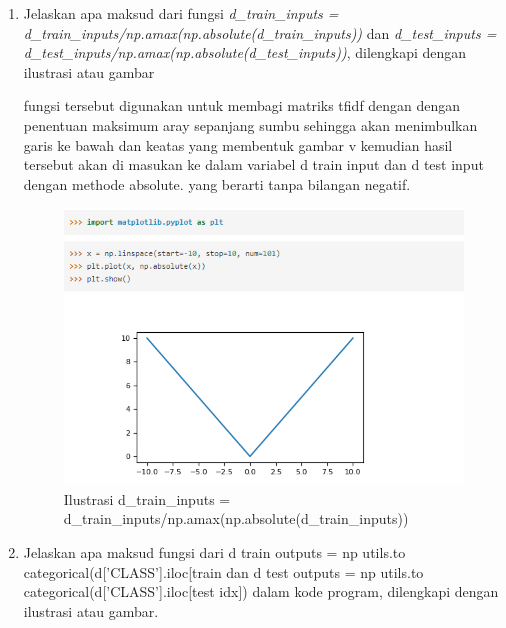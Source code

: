 \begin{enumerate}
\item Jelaskan apa maksud dari fungsi \emph{d\_train\_inputs = d\_train\_inputs/np.amax(np.absolute(d\_train\_inputs))} dan \emph{d\_test\_inputs = d\_test\_inputs/np.amax(np.absolute(d\_test\_inputs))}, dilengkapi dengan ilustrasi atau gambar \par

fungsi tersebut digunakan untuk membagi matriks tfidf dengan dengan penentuan maksimum aray sepanjang sumbu sehingga akan menimbulkan garis ke bawah dan keatas yang membentuk gambar v kemudian hasil tersebut akan di masukan ke dalam variabel d train input dan d test input dengan methode absolute. yang berarti tanpa bilangan negatif.
\begin{figure}[ht]
\centering
\includegraphics[scale=0.4]{figures/1174002/chapter7/7.PNG}
\caption{Ilustrasi d\_train\_inputs = d\_train\_inputs/np.amax(np.absolute(d\_train\_inputs))}
\label{Contoh}
\end{figure}


\item Jelaskan apa maksud fungsi dari d train outputs = np utils.to categorical(d['CLASS'].iloc[train dan d test outputs = np utils.to categorical(d['CLASS'].iloc[test idx]) dalam kode program, dilengkapi dengan ilustrasi atau gambar.\par


\end{enumerate}
